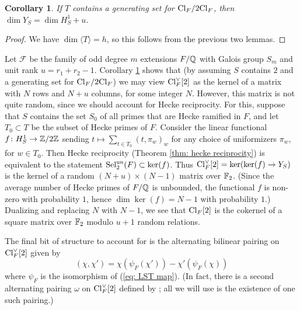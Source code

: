 \documentclass[11pt,a4paper]{amsart}
\newcommand{\artane}[1]{{\color{red} \sf $\clubsuit\clubsuit\clubsuit$ Artane: [#1]}}
\def\F{{\rm \mathbb{F}}}
\def\Z{{\rm \mathbb{Z}}}
\def\Q{{\rm \mathbb{Q}}}
\def\un{{\rm un}}
\def\Cl{{\rm Cl}}
\def\Sel{{\rm Sel}}
\numberwithin{equation}{section}
\newtheorem{corollary}[theorem]{Corollary}
\begin{document}
\begin{corollary}\label{cor: square}
    If $T$ contains a generating set for $\Cl_F/2\Cl_F$, then $\dim Y_S = \dim H^1_S + u$. 
\end{corollary}
\begin{proof}
    We have $\dim \langle T\rangle = h$, so this follows from the previous two lemmas. 
\end{proof}

Let $\mathcal{F}$ be the family of odd degree $m$ extensions $F/\Q$ with Galois group $S_m$ and unit rank $u = r_1 + r_2 - 1$. Corollary \ref{cor: square} shows that (by assuming $S$ contains $2$ and a generating set for $\Cl_F/2\Cl_F$) we may view $\Cl_F^\vee[2]$ as the kernel of a matrix with $N$ rows and $N + u$ columns, for some integer $N$. However, this matrix is not quite random, since we should account for Hecke reciprocity.  For this, suppose that $S$ contains the set $S_0$ of all primes that are Hecke ramified in $F$, and let $T_0 \subset T$ be the subset of Hecke primes of $F$. Consider the linear functional $f \colon H^1_S \to \Z/2\Z$ sending $t \mapsto \sum_{t \in T_0} (t,\pi_w)_w$ for any choice of uniformizers $\pi_w$, for $w \in T_0$. Then Hecke reciprocity (Theorem \ref{thm: hecke reciprocity}) is equivalent to the statement $\Sel_2^\un(F) \subset \ker(f)$. Thus $\Cl_F^\vee[2] = \ker(\ker(f) \to Y_S)$ is the kernel of a random $(N+u) \times (N-1)$ matrix over $\F_2$. (Since the average number of Hecke primes of $F/\Q$ is unbounded, the functional $f$ is non-zero with probability $1$, hence $\dim \ker(f) = N-1$ with probability $1$.) Dualizing and replacing $N$ with $N-1$, we see that $\Cl_F[2]$ is the cokernel of a square matrix over $\F_2$ modulo $u+1$ random relations.  

The final bit of structure to account for is the alternating bilinear pairing on $\Cl_F^\vee[2]$ given by
\[(\chi,\chi') = \chi(\psi_F(\chi')) - \chi'(\psi_F(\chi))\]
where $\psi_F$ is the isomorphism of (\ref{eq: LST map}). (In fact, there is a second alternating pairing $\omega$ on $\Cl_F^\vee[2]$ defined by \cite{LipnowskiSawinTsimerman}; all we will use is the existence of one such pairing.) 

\end{document}
